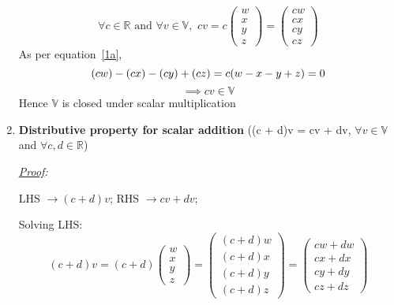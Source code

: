 \documentclass[12pt, letterpaper]{article}
\begin{document}
\begin{enumerate}
  \[
    \forall c \in \mathbb{R} \text{ and } \forall v \in \mathbb{V}, \,\,
    cv = c\begin{pmatrix}w\\x\\y\\z\end{pmatrix}
    = \begin{pmatrix}cw\\cx\\cy\\cz\end{pmatrix}
  \]
  As per equation~\ref{1a},
  \[(cw) - (cx) - (cy) + (cz) = c(w -x -y +z) = 0\\ \]
  \[\implies \boxed{cv \in \mathbb{V}} \]
  Hence $\mathbb{V}$ is closed under scalar multiplication

\item \textbf{Distributive property for scalar addition}
  ((c + d)v = cv + dv, $\forall v \in \mathbb{V}$ and $\forall c,d \in \mathbb{R}$)

\textit{\underline{Proof}:}

  LHS $\to (c + d)v$; RHS $\to cv + dv$;

  Solving LHS:
  \begin{equation}
  \label{1a6}
    (c + d)v
    = (c + d)\begin{pmatrix}w\\x\\y\\z\end{pmatrix}
    = \begin{pmatrix}(c + d)w\\(c + d)x\\(c + d)y\\(c + d)z\end{pmatrix}
    = \begin{pmatrix}cw + dw\\cx + dx\\cy + dy\\cz + dz\end{pmatrix}
  \end{equation}


\end{enumerate}
\end{document}
